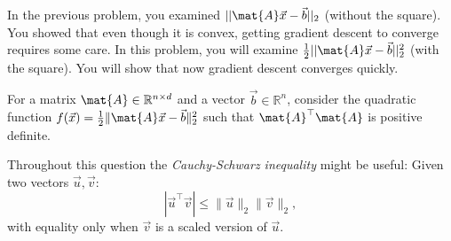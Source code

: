 \documentclass[preview]{standalone}
\begin{document}

\newcommand{\CC}{\beta}  
In the previous problem, you examined $||\mat{A}\vec{x}-\vec{b}||_2$ (without the square).
You showed that even though it is convex, getting gradient descent to converge
requires some care.
In this problem, you will examine $\frac{1}{2}||\mat{A}\vec{x}-\vec{b}||_2^2$
(with the square). You will show that now gradient descent converges quickly.

For a matrix $\mat{A} \in \mathbb{R}^{n \times d}$ and a vector $\vec{b} \in \mathbb{R}^n$,
consider the quadratic function $f(\vec{x}) = \frac{1}{2} \| \mat{A}\vec{x}-\vec{b} \|_2^2$
such that $\mat{A}^\top\mat{A}$ is positive definite.

Throughout this question the \emph{Cauchy-Schwarz inequality} might be useful:
Given two vectors $\vec{u}, \vec{v}$:
$$|\vec{u}^\top \vec{v}| \leq \|\vec{u}\|_2 \|\vec{v}\|_2,$$
with equality only when $\vec{v}$ is a scaled version of $\vec{u}$.
\end{document}
